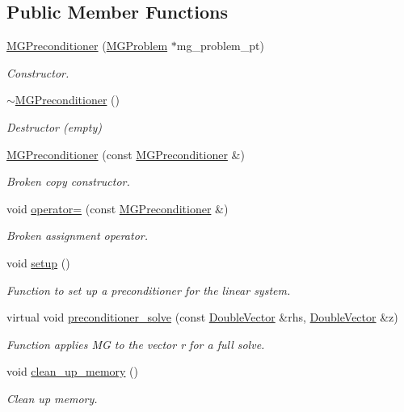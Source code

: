 \subsection*{Public Member Functions}
\begin{DoxyCompactItemize}
\item 
\hyperlink{classoomph_1_1MGPreconditioner_a57daf87cd60b23d39670c462afba7371}{M\+G\+Preconditioner} (\hyperlink{classoomph_1_1MGProblem}{M\+G\+Problem} $\ast$mg\+\_\+problem\+\_\+pt)
\begin{DoxyCompactList}\small\item\em Constructor. \end{DoxyCompactList}\item 
\hyperlink{classoomph_1_1MGPreconditioner_ae11d01b071f771150fcc608cee379bf1}{$\sim$\+M\+G\+Preconditioner} ()
\begin{DoxyCompactList}\small\item\em Destructor (empty) \end{DoxyCompactList}\item 
\hyperlink{classoomph_1_1MGPreconditioner_aaa38a856cda8e4b6ee612bc9d4ad1509}{M\+G\+Preconditioner} (const \hyperlink{classoomph_1_1MGPreconditioner}{M\+G\+Preconditioner} \&)
\begin{DoxyCompactList}\small\item\em Broken copy constructor. \end{DoxyCompactList}\item 
void \hyperlink{classoomph_1_1MGPreconditioner_ad7b9ea2798522fc6ae0aff7455ef4885}{operator=} (const \hyperlink{classoomph_1_1MGPreconditioner}{M\+G\+Preconditioner} \&)
\begin{DoxyCompactList}\small\item\em Broken assignment operator. \end{DoxyCompactList}\item 
void \hyperlink{classoomph_1_1MGPreconditioner_a476a8e769a62e52e1db6c618ede7408d}{setup} ()
\begin{DoxyCompactList}\small\item\em Function to set up a preconditioner for the linear system. \end{DoxyCompactList}\item 
virtual void \hyperlink{classoomph_1_1MGPreconditioner_afa4c545cc49e9712e4d68f5c0275aefe}{preconditioner\+\_\+solve} (const \hyperlink{classoomph_1_1DoubleVector}{Double\+Vector} \&rhs, \hyperlink{classoomph_1_1DoubleVector}{Double\+Vector} \&z)
\begin{DoxyCompactList}\small\item\em Function applies MG to the vector r for a full solve. \end{DoxyCompactList}\item 
void \hyperlink{classoomph_1_1MGPreconditioner_acc92bd3f8c9b729283d35c1f4ae37dd2}{clean\+\_\+up\+\_\+memory} ()
\begin{DoxyCompactList}\small\item\em Clean up memory. \end{DoxyCompactList}\end{DoxyCompactItemize}
